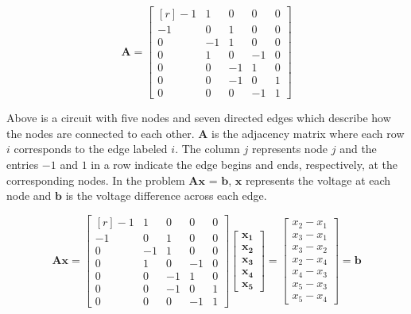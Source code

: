 \documentclass[11pt]{article} %
\begin{document}
\begin{center}
\[
\bm{A} = \begin{bmatrix*}[r]
  -1 & 1 & 0 & 0 & 0 \\
  -1 & 0 & 1 & 0 & 0 \\
   0 & -1 & 1 & 0 & 0 \\
   0 & 1 & 0 & -1 & 0 \\
   0 & 0 & -1 & 1 & 0 \\
   0 & 0 & -1 & 0 & 1 \\
   0 & 0 & 0 & -1 & 1
\end{bmatrix*}
\]
\end{center}

Above is a circuit with five nodes and seven directed edges which
describe how the nodes are connected to each other.  $\bm{A}$ is the
adjacency matrix where each row $i$ corresponds to the edge labeled
$i$.  The column $j$ represents node $j$ and the entries $-1$ and $1$
in a row indicate the edge begins and ends, respectively, at the
corresponding nodes.  In the problem $\bm{Ax}$ = $\bm{b}$, $\bm{x}$
represents the voltage at each node and $\bm{b}$ is the voltage
difference across each edge.

\[
\bm{Ax} = \begin{bmatrix*}[r]
  -1 & 1 & 0 & 0 & 0 \\
  -1 & 0 & 1 & 0 & 0 \\
   0 & -1 & 1 & 0 & 0 \\
   0 & 1 & 0 & -1 & 0 \\
   0 & 0 & -1 & 1 & 0 \\
   0 & 0 & -1 & 0 & 1 \\
   0 & 0 & 0 & -1 & 1
\end{bmatrix*}
\begin{bmatrix} \bm{x_1} \\ \bm{x_2} \\ \bm{x_3} \\ \bm{x_4} \\ \bm{x_5} \end{bmatrix} =
\begin{bmatrix} x_2 - x_1 \\ x_3 - x_1 \\ x_3 - x_2 \\ x_2 - x_4 \\ x_4 - x_3 \\ x_5 - x_3 \\ x_5 - x_4 \end{bmatrix} = \bm{b}
\]
\end{document}
